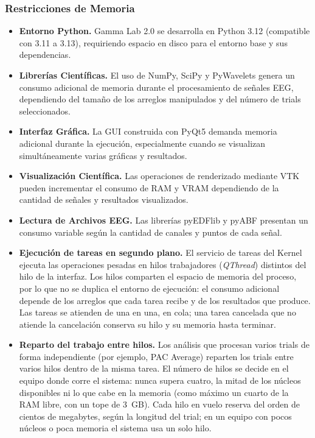 \documentclass[12pt, letterpaper]{article}
\begin{document}
\subsubsection{Restricciones de Memoria}

\begin{itemize}

    \item \textbf{Entorno Python.} Gamma Lab 2.0 se desarrolla en Python
    3.12 (compatible con 3.11 a 3.13), requiriendo espacio en disco para el entorno base y sus
    dependencias.

    \item \textbf{Librerías Científicas.} El uso de NumPy, SciPy
    y PyWavelets genera un consumo adicional de memoria
    durante el procesamiento de señales EEG, dependiendo del tamaño de los
    arreglos manipulados y del número de trials seleccionados.

    \item \textbf{Interfaz Gráfica.} La GUI construida con PyQt5 demanda
    memoria adicional durante la ejecución, especialmente cuando se
    visualizan simultáneamente varias gráficas y resultados.

    \item \textbf{Visualización Científica.} Las operaciones de renderizado
    mediante VTK pueden incrementar el consumo de RAM y VRAM dependiendo de
    la cantidad de señales y resultados visualizados.

    \item \textbf{Lectura de Archivos EEG.} Las librerías pyEDFlib y pyABF
    presentan un consumo variable según la cantidad de canales y puntos de
    cada señal.

    \item \textbf{Ejecución de tareas en segundo plano.} El servicio de tareas
    del Kernel ejecuta las operaciones pesadas en hilos trabajadores
    (\textit{QThread}) distintos del hilo de la interfaz. Los hilos comparten
    el espacio de memoria del proceso, por lo que no se duplica el entorno de
    ejecución: el consumo adicional depende de los arreglos que cada tarea
    recibe y de los resultados que produce. Las tareas se atienden de una en
    una, en cola; una tarea cancelada que no atiende la cancelación conserva
    su hilo y su memoria hasta terminar.

    \item \textbf{Reparto del trabajo entre hilos.} Los análisis que procesan
    varios trials de forma independiente (por ejemplo, PAC Average) reparten
    los trials entre varios hilos dentro de la misma tarea. El número de hilos
    se decide en el equipo donde corre el sistema: nunca supera cuatro, la
    mitad de los núcleos disponibles ni lo que cabe en la memoria (como máximo
    un cuarto de la RAM libre, con un tope de 3~GB). Cada hilo en vuelo reserva
    del orden de cientos de megabytes, según la longitud del trial; en un
    equipo con pocos núcleos o poca memoria el sistema usa un solo hilo.

\end{itemize}
\end{document}
